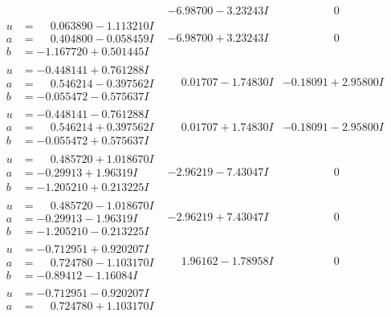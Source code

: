 \documentclass[1p]{elsarticle_modified}
\theoremstyle{definition}
\begin{document}
$$\begin{array}{c|c|c}
 & -6.98700 - 3.23243 I & \phantom{-0.000000 } 0 \\ \hline\begin{aligned}
u &= \phantom{-}0.063890 - 1.113210 I \\
a &= \phantom{-}0.404800 - 0.058459 I \\
b &= -1.167720 + 0.501445 I\end{aligned}
 & -6.98700 + 3.23243 I & \phantom{-0.000000 } 0 \\ \hline\begin{aligned}
u &= -0.448141 + 0.761288 I \\
a &= \phantom{-}0.546214 - 0.397562 I \\
b &= -0.055472 - 0.575637 I\end{aligned}
 & \phantom{-}0.01707 - 1.74830 I & -0.18091 + 2.95800 I \\ \hline\begin{aligned}
u &= -0.448141 - 0.761288 I \\
a &= \phantom{-}0.546214 + 0.397562 I \\
b &= -0.055472 + 0.575637 I\end{aligned}
 & \phantom{-}0.01707 + 1.74830 I & -0.18091 - 2.95800 I \\ \hline\begin{aligned}
u &= \phantom{-}0.485720 + 1.018670 I \\
a &= -0.29913 + 1.96319 I \\
b &= -1.205210 + 0.213225 I\end{aligned}
 & -2.96219 - 7.43047 I & \phantom{-0.000000 } 0 \\ \hline\begin{aligned}
u &= \phantom{-}0.485720 - 1.018670 I \\
a &= -0.29913 - 1.96319 I \\
b &= -1.205210 - 0.213225 I\end{aligned}
 & -2.96219 + 7.43047 I & \phantom{-0.000000 } 0 \\ \hline\begin{aligned}
u &= -0.712951 + 0.920207 I \\
a &= \phantom{-}0.724780 - 1.103170 I \\
b &= -0.89412 - 1.16084 I\end{aligned}
 & \phantom{-}1.96162 - 1.78958 I & \phantom{-0.000000 } 0 \\ \hline\begin{aligned}
u &= -0.712951 - 0.920207 I \\
a &= \phantom{-}0.724780 + 1.103170 I \\

\end{aligned}
\end{array}$$
\end{document}
